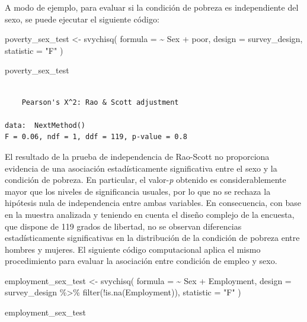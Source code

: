 \documentclass[
  spanish,
  11pt,
  letterpaper,
  oneside,
  open=any]{scrbook}
\newenvironment{Shaded}{\begin{snugshade}}{\end{snugshade}}
\newcommand{\AttributeTok}[1]{\textcolor[rgb]{0.40,0.45,0.13}{#1}}
\newcommand{\FunctionTok}[1]{\textcolor[rgb]{0.28,0.35,0.67}{#1}}
\newcommand{\NormalTok}[1]{\textcolor[rgb]{0.00,0.23,0.31}{#1}}
\newcommand{\OtherTok}[1]{\textcolor[rgb]{0.00,0.23,0.31}{#1}}
\newcommand{\SpecialCharTok}[1]{\textcolor[rgb]{0.37,0.37,0.37}{#1}}
\newcommand{\StringTok}[1]{\textcolor[rgb]{0.13,0.47,0.30}{#1}}
\begin{document}
A modo de ejemplo, para evaluar si la condición de pobreza es
independiente del sexo, se puede ejecutar el siguiente código:

\begin{Shaded}
\begin{Highlighting}[]
\NormalTok{poverty\_sex\_test }\OtherTok{\textless{}{-}} \FunctionTok{svychisq}\NormalTok{(}
  \AttributeTok{formula =} \SpecialCharTok{\textasciitilde{}}\NormalTok{ Sex }\SpecialCharTok{+}\NormalTok{ poor,}
  \AttributeTok{design =}\NormalTok{ survey\_design,}
  \AttributeTok{statistic =} \StringTok{"F"}
\NormalTok{)}

\NormalTok{poverty\_sex\_test}
\end{Highlighting}
\end{Shaded}

\begin{verbatim}

    Pearson's X^2: Rao & Scott adjustment

data:  NextMethod()
F = 0.06, ndf = 1, ddf = 119, p-value = 0.8
\end{verbatim}

El resultado de la prueba de independencia de Rao-Scott no proporciona
evidencia de una asociación estadísticamente significativa entre el sexo
y la condición de pobreza. En particular, el valor-\emph{p} obtenido es
considerablemente mayor que los niveles de significancia usuales, por lo
que no se rechaza la hipótesis nula de independencia entre ambas
variables. En consecuencia, con base en la muestra analizada y teniendo
en cuenta el diseño complejo de la encuesta, que dispone de 119 grados
de libertad, no se observan diferencias estadísticamente significativas
en la distribución de la condición de pobreza entre hombres y mujeres.
El siguiente código computacional aplica el mismo procedimiento para
evaluar la asociación entre condición de empleo y sexo.

\begin{Shaded}
\begin{Highlighting}[]
\NormalTok{employment\_sex\_test }\OtherTok{\textless{}{-}} \FunctionTok{svychisq}\NormalTok{(}
  \AttributeTok{formula =} \SpecialCharTok{\textasciitilde{}}\NormalTok{ Sex }\SpecialCharTok{+}\NormalTok{ Employment,}
  \AttributeTok{design =}\NormalTok{ survey\_design }\SpecialCharTok{\%\textgreater{}\%}
    \FunctionTok{filter}\NormalTok{(}\SpecialCharTok{!}\FunctionTok{is.na}\NormalTok{(Employment)),}
  \AttributeTok{statistic =} \StringTok{"F"}
\NormalTok{)}

\NormalTok{employment\_sex\_test}
\end{Highlighting}
\end{Shaded}
\end{document}
